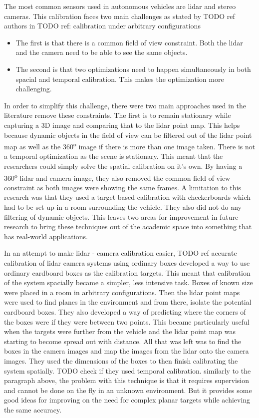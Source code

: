 The most common sensors used in autonomous vehicles are lidar and stereo cameras. This calibration faces two main challenges as stated by
TODO ref authors
in  
TODO ref: calibration under arbitrary configurations
\begin{itemize}
    \item The first is that there is a common field of view constraint. Both the lidar and the camera need to be able to see the same objects. 
    \item The second is that two optimizations need to happen simultaneously in both spacial and temporal calibration. This makes the optimization more challenging. 
\end{itemize}
In order to simplify this challenge, there were two main approaches used in the literature remove these constraints. The first is to remain stationary while capturing a 3D image and comparing that to the lidar point map. This helps because dynamic objects in the field of view can be filtered out of the lidar point map as well as the 360\textsuperscript{o} image if there is more than one image taken. There is not a temporal optimization as the scene is stationary. This meant that the researchers could simply solve the spatial calibration on it's own.
By having a 360\textsuperscript{o} lidar and camera image, they also removed the common field of view constraint as both images were showing the same frames. 
A limitation to this research was that they used a target based calibration with checkerboards which had to be set up in a room surrounding the vehicle. They also did not do any filtering of dynamic objects. This leaves two areas for improvement in future research to bring these techniques out of the academic space into something that has real-world applications.


In an attempt to make lidar - camera calibration easier, 
TODO ref accurate calibration of lidar camera systems using ordinary boxes
developed a way to use ordinary cardboard boxes as the calibration targets. This meant that calibration of the system spacially became a simpler, less intensive task. Boxes of known size were placed in a room in arbitrary configurations. Then the lidar point maps were used to find planes in the environment and from there, isolate the potential cardboard boxes. They also developed a  way of predicting where the corners of the boxes were if they were between two points. This became particularly useful when the targets were further from the vehicle and the lidar point map was starting to become spread out with distance.
All that was left was to find the boxes in the camera images and map the images from the lidar onto the camera images. They used the dimensions of the boxes to then finish calibrating the system spatially.
TODO check if they used temporal calibration.
similarly to the paragraph above, the problem with this technique is that it requires supervision and cannot be done on the fly in an unknown environment. But it provides some good ideas for improving on the need for complex planar targets while achieving the same accuracy. 


